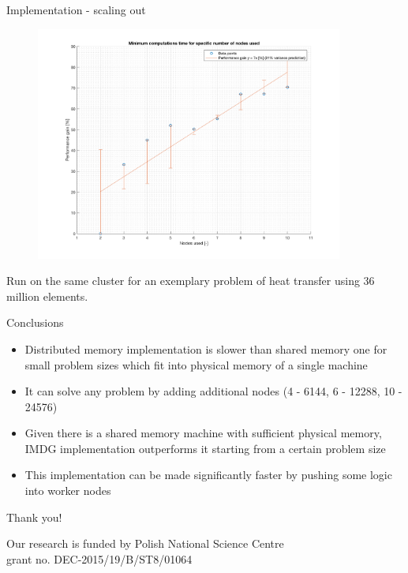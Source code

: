 \documentclass[c]{beamer}
\begin{document}

\begin{frame}{Implementation - scaling out}

\begin{figure}
      \centering
      \includegraphics[width=0.9\textwidth]{img/outScalability.png}
    \end{figure}
    
    {\tiny * Run on the same cluster for an exemplary problem of heat transfer using 36 million elements. }

\end{frame}


\begin{frame}{Conclusions}

\begin{itemize}
  \item Distributed memory implementation is slower than shared memory one for small problem sizes which fit into physical memory of a single machine
  \item It can solve any problem by adding additional nodes (4 - 6144, 6 - 12288, 10 - 24576)
  \item Given there is a shared memory machine with sufficient physical memory, IMDG implementation outperforms it starting from a certain problem size
  \item This implementation can be made significantly faster by pushing some logic into worker nodes
\end{itemize}

\end{frame}

\begin{frame}{Thank you!}


Our research is funded by Polish National Science Centre \\ grant no. DEC-2015/19/B/ST8/01064

\end{frame}

\end{document}
